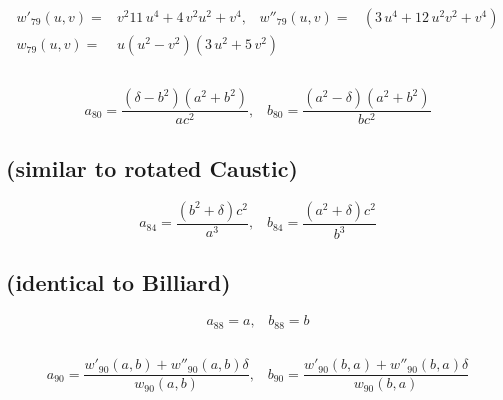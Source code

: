 \begin{align*}
w'_{79}(u,v)=&{v}^{2}   11\,{u}^{4}+4\,{v}^{2}{u}^{2}+{v}^{4},\;\;\;w''_{79}(u,v)=& \left( 3\,{u}^{4}+12\,{u}^{2}{v}^{2}+{v}^{4} \right)   \\
w_{79}(u,v)=&u \left( u^2-v^2 \right) \left( 3\,{u}^{2}+5\,{v}^{2} \right)
\end{align*}

\subsection{ }
      
\begin{equation*}
a_{80}={\frac{ \left( \delta-{b}^{2} 
      		\right)  \left( {a}^{2}+{b}^{2} \right)}{a c^2}},\;\;\;
b_{80}={\frac{ \left( {a}^{2}-\delta
      		\right)  \left( {a}^{2}+{b}^{2} \right)}{b c^2}}
\end{equation*}
      
\subsection{ (similar to rotated Caustic)}

\begin{equation*}
a_{84}=\frac{\left( {b}^{2}+\delta \right) c^2}{{a}^{3}},\;\;\;
b_{84}=\frac{\left( {a}^{2}+\delta \right) c^2}{{b}^{3}}
\end{equation*}
  
\subsection{ (identical to Billiard)}
      
\begin{equation*}
    a_{88}=a,\;\;\;b_{88}=b
\end{equation*}
      
\subsection{
}

\begin{equation*}
a_{90}= \frac{ w'_{90}(a,b) +  w''_{90}(a,b)\delta   }{w_{90}(a,b)},\;\;\;
b_{90}= \frac{w'_{90}(b,a)+w''_{90}(b,a) \delta  }{  w_{90}(b,a)}
\end{equation*}

